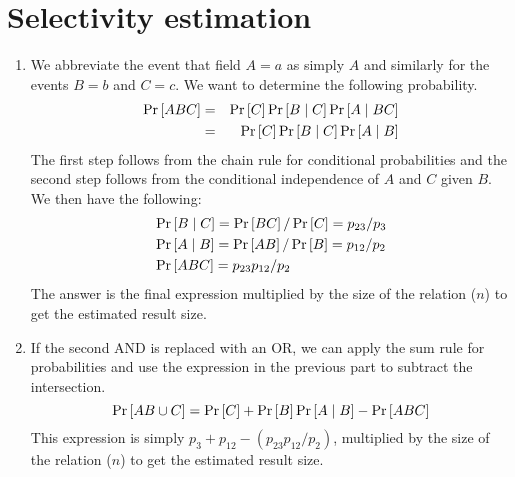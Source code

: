 \documentclass[12pt]{article}
\def\PR#1{\mathop{\rm {Pr}}\left[#1\right]}
\begin{document}
\pagebreak

\section{Selectivity estimation}

\begin{enumerate}
\item %
We abbreviate the event that field $A=a$ as simply $A$ and similarly for
the events $B=b$ and $C=c$.
We want to determine the following probability.
%
\begin{eqnarray*}
\PR{ABC} & = & \PR{C}\PR{B\mid C}\PR{A\mid BC}\\
         & = & \PR{C}\PR{B\mid C}\PR{A\mid B}
\end{eqnarray*}
%
The first step follows from the chain rule for conditional probabilities
and the second step follows from the conditional independence of $A$ and $C$
given $B$. We then have the following:
%
\begin{eqnarray*}
& \PR{B \mid C} = \PR{BC} / \PR{C} = p_{23} / p_{3} \\
& \PR{A \mid B} = \PR{AB} / \PR{B} = p_{12} / p_{2} \\
& \PR{ABC} = p_{23} p_{12} / p_{2} \\
\end{eqnarray*}
%
The answer is the final expression multiplied by the size of the
relation ($n$) to get the estimated result size.

\item %

If the second \textsc{AND} is replaced with an \textsc{OR}, we can apply
the sum rule for probabilities and use the expression in the previous
part to subtract the intersection.
%
\begin{displaymath}
\PR{AB \cup C} = \PR{C} + \PR{B}\PR{A\mid B} - \PR{ABC}
\end{displaymath}
%
This expression is simply $p_{3} + p_{12} - (p_{23} p_{12} / p_{2})$,
multiplied by the size of the
relation ($n$) to get the estimated result size.

\end{enumerate}

\pagebreak

\end{document}
